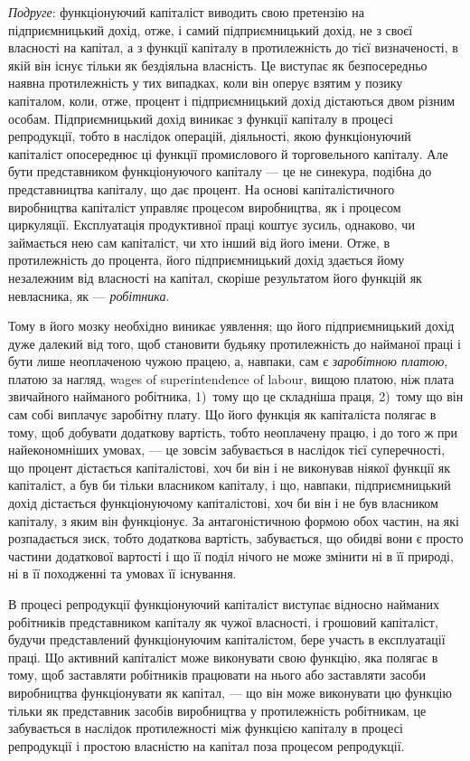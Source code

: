 \emph{Подруге}: функціонуючий капіталіст виводить свою претензію
на підприємницький дохід, отже, і самий підприємницький дохід,
не з своєї власності на капітал, а з функції капіталу в протилежність
до тієї визначеності, в якій він існує тільки як бездіяльна
власність. Це виступає як безпосередньо наявна протилежність
у тих випадках, коли він оперує взятим у позику капіталом,
коли, отже, процент і підприємницький дохід дістаються
двом різним особам. Підприємницький дохід виникає з функції
капіталу в процесі репродукції, тобто в наслідок операцій, діяльності,
якою функціонуючий капіталіст опосереднює ці функції
промислового й торговельного капіталу. Але бути представником
функціонуючого капіталу — це не синекура, подібна до представництва
капіталу, що дає процент. На основі капіталістичного
виробництва капіталіст управляє процесом виробництва, як і процесом
циркуляції. Експлуатація продуктивної праці коштує зусиль,
однаково, чи займається нею сам капіталіст, чи хто інший від його
імени. Отже, в протилежність до процента, його підприємницький
дохід здається йому незалежним від власності на капітал,
скоріше результатом його функцій як невласника, як — \emph{робітника}.

Тому в його мозку необхідно виникає уявлення; що його підприємницький
дохід дуже далекий від того, щоб становити будьяку
протилежність до найманої праці і бути лише неоплаченою чужою
працею, а, навпаки, сам є \emph{заробітною платою}, платою за нагляд,
wages of superintendence of labour, вищою платою, ніж плата звичайного
найманого робітника, 1)~тому що це складніша праця, 2)~тому
що він сам собі виплачує заробітну плату. Що його функція
як капіталіста полягає в тому, щоб добувати додаткову вартість,
тобто неоплачену працю, і до того ж при найекономніших умовах,
— це зовсім забувається в наслідок тієї суперечності, що процент
дістається капіталістові, хоч би він і не виконував ніякої
функції як капіталіст, а був би тільки власником капіталу, і що,
навпаки, підприємницький дохід дістається функціонуючому капіталістові,
хоч би він і не був власником капіталу, з яким він
функціонує. За антагоністичною формою обох частин, на які
розпадається зиск, тобто додаткова вартість, забувається, що
обидві вони є просто частини додаткової вартості і що її поділ
нічого не може змінити ні в її природі, ні в її походженні та
умовах її існування.

В процесі репродукції функціонуючий капіталіст виступає
відносно найманих робітників представником капіталу як чужої
власності, і грошовий капіталіст, будучи представлений функціонуючим
капіталістом, бере участь в експлуатації праці. Що
активний капіталіст може виконувати свою функцію, яка полягає
в тому, щоб заставляти робітників працювати на нього або
заставляти засоби виробництва функціонувати як капітал, — що
він може виконувати цю функцію тільки як представник засобів
виробництва у протилежність робітникам, це забувається
в наслідок протилежності між функцією капіталу в процесі
репродукції і простою власністю на капітал поза процесом
репродукції.

